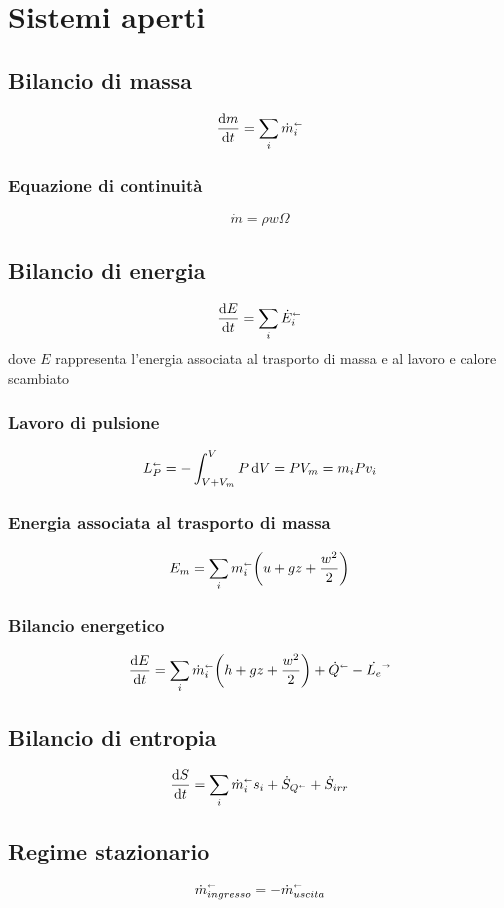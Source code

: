 \section{Sistemi aperti}

\subsection{Bilancio di massa}
\[ \dv{m}{t} = \sum_i \dot{m}_i^\shortleftarrow \]

\subsubsection{Equazione di continuità}
\[ \dot{m} = \rho w \Omega \]

\subsection{Bilancio di energia}
\[ \dv{E}{t} = \sum_i \dot{E}_i^\shortleftarrow \]
dove $E$ rappresenta l'energia associata al trasporto di massa e al lavoro e calore scambiato

\subsubsection{Lavoro di pulsione}
\[ L_P^\shortleftarrow = - \int^{V}_{V+V_m} P\dd{V} = PV_m = m_i P v_i \]
\subsubsection{Energia associata al trasporto di massa}
\[ E_m = \sum_i m_i^\shortleftarrow \qty(u + gz + \frac{w^2}{2}) \]
\subsubsection{Bilancio energetico}
\[ \dv{E}{t} = \sum_i \dot{m}_i^\shortleftarrow \qty(h + gz + \frac{w^2}{2}) + \dot{Q}^\shortleftarrow - \dot{L_e}^\shortrightarrow\]

\subsection{Bilancio di entropia}
\[ \dv{S}{t} = \sum_i \dot{m}_i^\shortleftarrow s_i + \dot{S}_{Q^\shortleftarrow} + \dot{S}_{irr} \]

\subsection{Regime stazionario}
\[ \dot{m}_{ingresso}^\shortleftarrow = -\dot{m}_{uscita}^\shortleftarrow \]

